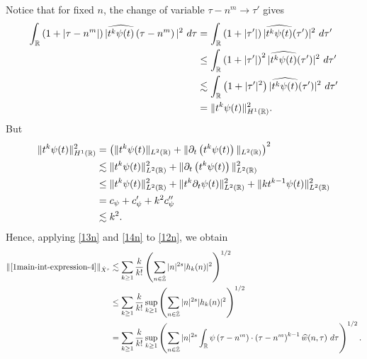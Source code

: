 %
%
Notice that for fixed $n$, the change of variable $\tau - n^m \to \tau'$
gives
%
%
\begin{equation}
	\label{13n}
	\begin{split}
		\int_{\mathbb{R}} \left( 1 + | \tau - n^m | \right) | \widehat{t^{k}
		\psi(t)}\left( \tau - n^m \right) |^2 \ d \tau
		& = \int_{\mathbb{R}} \left( 1 + |\tau'| \right) | \widehat{t^k \psi(t)}(\tau') |^2 \
		d \tau'
		\\
		& \le \int_{\mathbb{R}} \left( 1 + |\tau'| \right)^2 | \widehat{t^k \psi(t)}(\tau')
		|^2 \ d \tau'
		\\
		& \lesssim \int_{\mathbb{R}} \left( 1 + | \tau' |^2 \right) | \widehat{t^{k}
		\psi(t)}(\tau') |^2 \ d \tau'
		\\
		& = \|t^k \psi(t) \|_{H^1(\mathbb{R})}^2.
	\end{split}
\end{equation}
%
%
But
%
%
\begin{equation}
	\label{14n}
	\begin{split}
		\|t^k \psi(t) \|_{H^1(\mathbb{R})}^2
		& = \left( \|t^k \psi(t)\|_{L^2(\mathbb{R})} + \|\partial_t \left( t^k \psi(t)
		\right)\|_{L^2(\mathbb{R})} \right)^2
		\\
		& \lesssim \|t^{k}\psi(t) \|_{L^2(\mathbb{R})}^2 + \|\partial_t \left (t^{k}
		\psi(t) \right )\|_{L^2(\mathbb{R})}^2
		\\
		& \le \|t^k \psi(t) \|_{L^2(\mathbb{R})}^2 + \|t^k \partial_t \psi(t)
		\|_{L^2(\mathbb{R})}^2 + \|k t^{k -1} \psi(t) \|_{L^2(\mathbb{R})}^2
		\\
		& = c_{\psi} + c_{\psi}' + k^2 c_{\psi}''
		\\
		& \lesssim k^2.
	\end{split}
\end{equation}
%
%
Hence, applying \eqref{13n} and \eqref{14n} to \eqref{12n}, we obtain
%
\begin{equation}
	\label{15n}
	\begin{split}
		\|\eqref{1main-int-expression-4} \|_{\dot{X}^s}
		& \lesssim
		\sum_{k \ge 1} \frac{k}{k!} \left( \sum_{n \in \dot{\mathbb{Z}}} |n|^{2s} | h_k(n) |^2 
		\right)^{1/2}
		\\
		& \le \sum_{k \ge 1} \frac{k}{k!}
		 \sup_{k \ge 1} \left( \sum_{n \in \dot{\mathbb{Z}}} |n|^{2s} | 
		h_k(n) |^2 \right)^{1/2}
		\\
		& = \sum_{k \ge 1} \frac{k}{k!}  \sup_{k \ge 1} 
		\left( \sum_{n \in \dot{\mathbb{Z}}} |n|^{2s} \int_{\mathbb{R}} 
		\psi\left( \tau - n^m \right) \cdot \left( \tau - n^m 
		\right)^{k -1} \widehat{w}(n, \tau) \ d \tau \right)^{1/2}.
	\end{split}
\end{equation}
%

